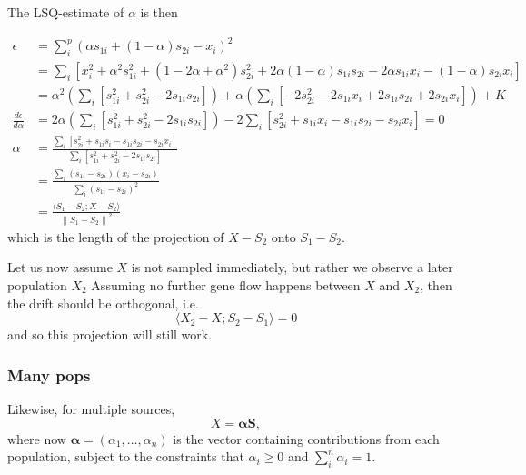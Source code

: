 \documentclass[12pt,fullpage, a4paper]{article}
\newcommand{\normsq}[1]{\left\lVert#1\right\rVert^2}
\newcommand{\MS}{\mathbf{S}} %
\newcommand{\MALPHA}{\boldsymbol{\alpha}}
\begin{document}
The LSQ-estimate of $\alpha$ is then

\begin{align}
\epsilon &=  \sum_i^p \left(\alpha s_{1i} + (1-\alpha) s_{2i} - x_{i}\right)^2\\
&= \sum_i [x_{i}^2 + \alpha^2 s_{1i}^2 + (1-2\alpha + \alpha^2) s_{2i}^2 + 2\alpha(1-\alpha) s_{1i}s_{2i} - 2\alpha s_{1i}x_i - (1-\alpha)s_{2i}x_{i}]\\
&=\alpha^2 \left( \sum_i [s_{1i}^2 + s_{2i}^2 - 2s_{1i}s_{2i}]\right) + \alpha \left(\sum_i[-2s_{2i}^2 - 2 s_{1i}x_{i} + 2 s_{1i}s_{2i} +  2 s_{2i}x_{i}]\right) + K\\
\frac{d \epsilon}{d \alpha} &= 2\alpha \left(\sum_i[s_{1i}^2 +  s_{2i}^2 -  2s_{1i}s_{2i}]\right) - 2\sum_i[s_{2i}^2 + s_{1i}x_{i} - s_{1i}s_{2i} -  s_{2i}x_{i}] = 0 \\
\alpha &= \frac{\sum_i[s_{2i}^2 +  s_{1i}s_{i} -  s_{1i}s_{2i} -   s_{2i}x_{i}]}
{\sum_i[s_{1i}^2 +  s_{2i}^2 -  2s_{1i}s_{2i}]}\\
&= \frac{ \sum_i(s_{1i} - s_{2i})(x_{i} - s_{2i})  }{\sum_i(s_{1i} - s_{2i})^2}\\
&= \frac{\langle S_1 - S_2; X - S_2 \rangle} {\normsq{S_1 - S_2}}
\end{align}
which is the length of the projection of $X - S_2 $ onto $S_1- S_2$.


Let us now assume $X$ is not sampled immediately, but rather we observe a later population $X_2$ Assuming no further gene flow happens between $X$ and $X_2$, then the drift should be orthogonal, i.e. 
$$ \langle X_2 - X ; S_2 - S_1\rangle = 0$$
and so this projection will still work.




\subsubsection{Many pops}
Likewise, for multiple sources,
\begin{equation}
X = \MALPHA \MS,
\end{equation}
where now $\MALPHA = (\alpha_1, \dots, \alpha_n)$ is the vector containing contributions from each population, subject to the constraints that $\alpha_i \geq 0$  and $\sum_i^n \alpha_i = 1$.
\end{document}
